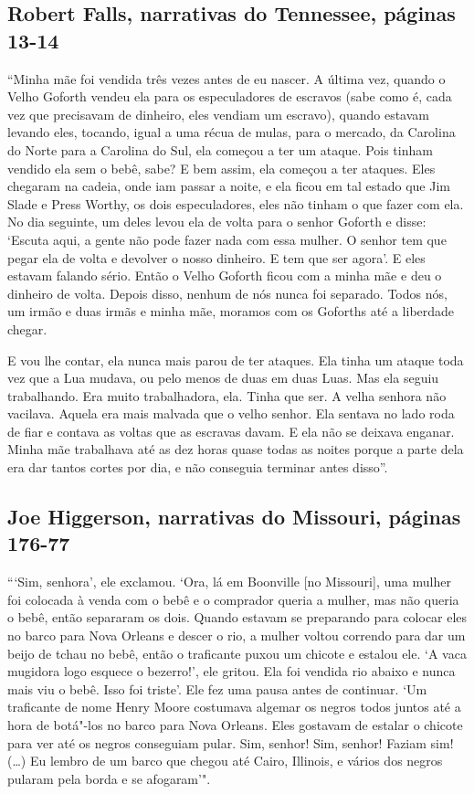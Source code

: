 \subsection{Robert Falls, narrativas do Tennessee, páginas 13-14} \label{ref87}

``Minha mãe foi vendida três vezes antes de eu nascer. A última vez,
quando o Velho Goforth vendeu ela para os especuladores de escravos
(sabe como é, cada vez que precisavam de dinheiro, eles vendiam um
escravo), quando estavam levando eles, tocando, igual a uma récua de
mulas, para o mercado, da Carolina do Norte para a Carolina do Sul, ela
começou a ter um ataque. Pois tinham vendido ela sem o bebê, sabe? E bem
assim, ela começou a ter ataques. Eles chegaram na cadeia, onde iam
passar a noite, e ela ficou em tal estado que Jim Slade e Press Worthy,
os dois especuladores, eles não tinham o que fazer com ela. No dia
seguinte, um deles levou ela de volta para o senhor Goforth e disse:
`Escuta aqui, a gente não pode fazer nada com essa mulher. O senhor tem
que pegar ela de volta e devolver o nosso dinheiro. E tem que ser
agora'. E eles estavam falando sério. Então o Velho Goforth ficou com a
minha mãe e deu o dinheiro de volta. Depois disso, nenhum de nós nunca
foi separado. Todos nós, um irmão e duas irmãs e minha mãe, moramos com
os Goforths até a liberdade chegar.

E vou lhe contar, ela nunca mais parou de ter ataques. Ela tinha um
ataque toda vez que a Lua mudava, ou pelo menos de duas em duas Luas.
Mas ela seguiu trabalhando. Era muito trabalhadora, ela. Tinha que ser.
A velha senhora não vacilava. Aquela era mais malvada que o velho
senhor. Ela sentava no lado roda de fiar e contava as voltas que as %
escravas davam. E ela não se deixava enganar. Minha mãe trabalhava até
as dez horas quase todas as noites porque a parte dela era dar tantos
cortes por dia, e não conseguia terminar antes disso''.

\subsection{Joe Higgerson, narrativas do Missouri, páginas 176-77}
\label{ref143}

```Sim, senhora', ele exclamou. `Ora, lá em Boonville {[}no Missouri{]},
uma mulher foi colocada à venda com o bebê e o comprador queria a
mulher, mas não queria o bebê, então separaram os dois. Quando estavam
se preparando para colocar eles no barco para Nova Orleans e descer o
rio, a mulher voltou correndo para dar um beijo de tchau no bebê, então
o traficante puxou um chicote e estalou ele. `A vaca mugidora logo
esquece o bezerro!', ele gritou. Ela foi vendida rio abaixo e nunca
mais viu o bebê. Isso foi triste'. Ele fez uma pausa antes de continuar.
`Um traficante de nome Henry Moore costumava algemar os negros todos
juntos até a hora de botá"-los no barco para Nova Orleans. Eles gostavam
de estalar o chicote para ver até os negros conseguiam pular. Sim, %
senhor! Sim, senhor! Faziam sim! (\ldots{}) Eu lembro de um barco que
chegou até Cairo, Illinois, e vários dos negros pularam pela borda e se
afogaram'".

